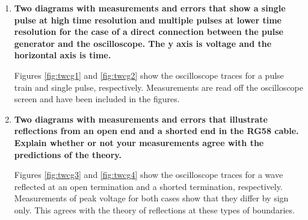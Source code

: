 \begin{enumerate}
\item {\bf Two diagrams with measurements and errors that show a single pulse at high time resolution and multiple pulses at lower time resolution for the case of a  direct connection between the pulse generator and the oscilloscope. The y axis is voltage and the horizontal axis is time.}\newline

Figures \ref{fig:twcg1} and \ref{fig:twcg2} show the oscilloscope traces for a pulse train and single pulse, respectively. Measurements are read off the oscilloscope screen and have been included in the figures.


\item {\bf Two diagrams with measurements and errors that illustrate reflections from an open end and a shorted end in the RG58 cable. Explain whether or not  your measurements agree with the predictions of the theory.}\newline

Figures \ref{fig:twcg3} and \ref{fig:twcg4} show the oscilloscope traces for a wave reflected at an open termination and a shorted termination, respectively. Measurements of peak voltage for both cases show that they differ by sign only. This agrees with the theory of reflections at these types of boundaries.

\begin{marginfigure}
\end{marginfigure}
\end{enumerate}
